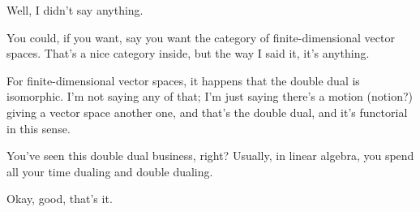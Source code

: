 \begin{speech}[01:30:08 - 01:30:50]
Well, I didn't say anything.

You could, if you want, say you want the category of finite-dimensional vector spaces. That's a nice category inside, but the way I said it, it's anything.

For finite-dimensional vector spaces, it happens that the double dual is isomorphic. I'm not saying any of that; I'm just saying there's a motion (notion?) giving a vector space another one, and that's the double dual, and it's functorial in this sense.

You've seen this double dual business, right? Usually, in linear algebra, you spend all your time dualing and double dualing.

Okay, good, that's it. 
\end{speech}

